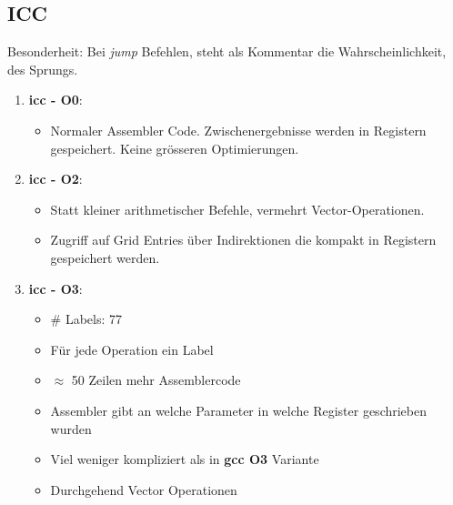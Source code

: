 \documentclass{article}
\begin{document}
\subsection*{ICC}
Besonderheit: Bei \textit{jump} Befehlen, steht als Kommentar die Wahrscheinlichkeit,
des Sprungs.
\begin{enumerate}
	\item{ \textbf{icc - O0}:
			\begin{itemize}
				\item Normaler Assembler Code. Zwischenergebnisse werden in Registern
					gespeichert. Keine gr\"osseren Optimierungen.
			\end{itemize}
		}
	\item{ \textbf{icc - O2}:
			\begin{itemize}
				\item Statt kleiner arithmetischer Befehle, vermehrt Vector-Operationen.
				\item Zugriff auf Grid Entries \"uber Indirektionen die kompakt
					in Registern gespeichert werden.
			\end{itemize}
		}
	\item{ \textbf{icc - O3}:
			\begin{itemize}
				\item \# Labels: 77
				\item F\"ur jede Operation ein Label
				\item $\approx$ 50 Zeilen mehr Assemblercode
				\item Assembler gibt an welche Parameter in welche Register
					geschrieben wurden
				\item Viel weniger kompliziert als in \textbf{gcc O3} Variante
				\item Durchgehend Vector Operationen
			\end{itemize}
		}
\end{enumerate}
\end{document}
